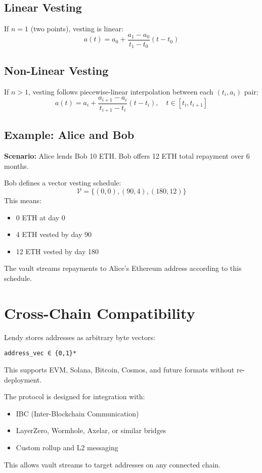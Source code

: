 \documentclass[11pt]{article}
\begin{document}
\subsection{Linear Vesting}
If $n=1$ (two points), vesting is linear:
\begin{equation}
a(t) = a_0 + \frac{a_1 - a_0}{t_1 - t_0} (t - t_0)
\end{equation}

\subsection{Non-Linear Vesting}
If $n>1$, vesting follows piecewise-linear interpolation between each $(t_i, a_i)$ pair:
\begin{equation}
a(t) = a_i + \frac{a_{i+1} - a_i}{t_{i+1} - t_i} (t - t_i), \quad t \in [t_i, t_{i+1}]
\end{equation}

\subsection{Example: Alice and Bob}
\textbf{Scenario:} Alice lends Bob 10 ETH. Bob offers 12 ETH total repayment over 6 months.

Bob defines a vector vesting schedule:
\begin{equation}
\mathcal{V} = \{ (0, 0), (90, 4), (180, 12) \}
\end{equation}
This means:
\begin{itemize}
    \item 0 ETH at day 0
    \item 4 ETH vested by day 90
    \item 12 ETH vested by day 180
\end{itemize}
The vault streams repayments to Alice's Ethereum address according to this schedule.

\section{Cross-Chain Compatibility}
Lendy stores addresses as arbitrary byte vectors:
\begin{verbatim}
address_vec ∈ {0,1}*
\end{verbatim}
This supports EVM, Solana, Bitcoin, Cosmos, and future formats without re-deployment.

The protocol is designed for integration with:
\begin{itemize}
    \item IBC (Inter-Blockchain Communication)
    \item LayerZero, Wormhole, Axelar, or similar bridges
    \item Custom rollup and L2 messaging
\end{itemize}
This allows vault streams to target addresses on any connected chain.
\end{document}
